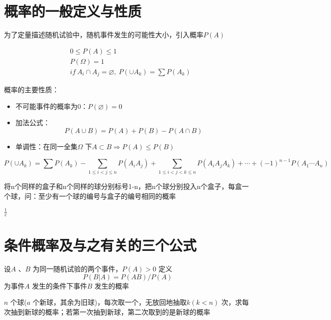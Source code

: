 \documentclass[11pt,fleqn]{book} %
\begin{document}
\section{概率的一般定义与性质}
为了定量描述随机试验中，随机事件发生的可能性大小，引入概率$ P(A) $ 

\begin{theorem}[概率三公理]
\begin{align}
& 0\leqslant P(A)\leqslant 1\\ 
& P(\Omega)=1\\
& if~A_i \cap A_j=\varnothing,~P(\cup A_k)=\sum P(A_k)
\end{align}
\end{theorem}


概率的主要性质：
\begin{itemize}
    \item 不可能事件的概率为0：$ P(\varnothing)=0 $
    \item 加法公式：$$ P(A\cup B)=P(A)+P(B)-P(A\cap B) $$ 
    \item 单调性：在同一全集$ \Omega $ 下$ A\subset B\Rightarrow P(A)\leqslant P(B) $ 
\end{itemize} 
\begin{corollary}[“多退少补公式”]
   $$ P(\cup A_k)= \sum P(A_k)-\sum\limits_{1\leqslant i<j\leqslant n}P(A_i A_j)+\sum\limits_{1\leqslant i<j<k\leqslant n}P(A_i A_j A_k)+\cdots+(-1)^{n-1}P(A_1\cdots A_n) $$
\end{corollary}
\begin{exercise}
    将n个同样的盒子和n个同样的球分别标号1-n，把n个球分别投入n个盒子，每盒一个球，问：至少有一个球的编号与盒子的编号相同的概率
\end{exercise}
\begin{remark}
    $ \frac{1}{e} $ 
\end{remark}
\section{条件概率及与之有关的三个公式}
\begin{definition}[条件概率]
    设$ A $ 、$ B $  为同一随机试验的两个事件，$ P(A)>0 $ 定义$$ P(B|A)=P(AB)/P(A) $$ 为事件$ A $ 发生的条件下事件$ B $ 发生的概率
    
\end{definition}

\begin{exercise}[抓阄的公平性]
    $ n $ 个球($ a $ 个新球，其余为旧球)，每次取一个，无放回地抽取$ k(k<n) $ 次，求每次抽到新球的概率；若第一次抽到新球，第二次取到的是新球的概率
\end{exercise}
\end{document}

